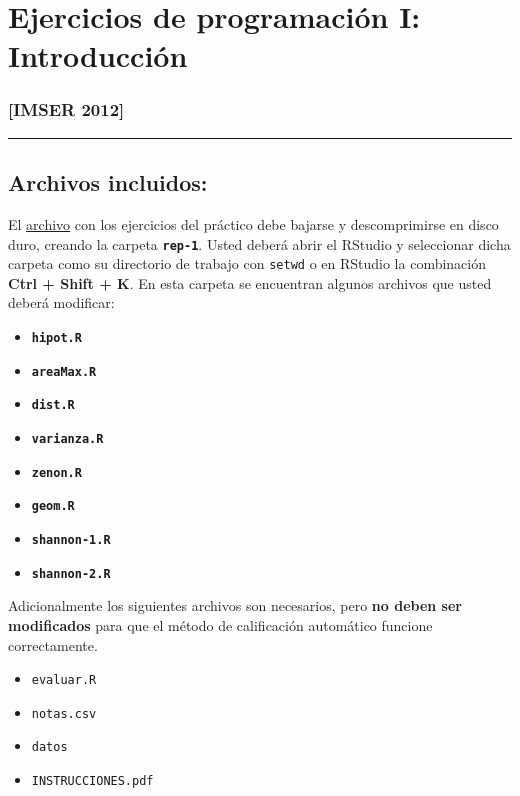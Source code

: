 \documentclass[]{article}
\begin{document}
\section{Ejercicios de programación I: Introducción}

\subsubsection{{[}IMSER 2012{]}}

\begin{center}\rule{3in}{0.4pt}\end{center}

\subsection{Archivos incluidos:}

El
\href{http://eva.universidad.edu.uy/file.php/1454/ejercicios\_de\_programacion/rep-1.zip}{archivo}
con los ejercicios del práctico debe bajarse y descomprimirse en disco
duro, creando la carpeta \textbf{\texttt{rep-1}}. Usted deberá abrir el
RStudio y seleccionar dicha carpeta como su directorio de trabajo con
\texttt{setwd} o en RStudio la combinación \textbf{Ctrl + Shift + K}. En
esta carpeta se encuentran algunos archivos que usted deberá modificar:

\begin{itemize}
\item
  \textbf{\texttt{hipot.R}}
\item
  \textbf{\texttt{areaMax.R}}
\item
  \textbf{\texttt{dist.R}}
\item
  \textbf{\texttt{varianza.R}}
\item
  \textbf{\texttt{zenon.R}}
\item
  \textbf{\texttt{geom.R}}
\item
  \textbf{\texttt{shannon-1.R}}
\item
  \textbf{\texttt{shannon-2.R}}
\end{itemize}
Adicionalmente los siguientes archivos son necesarios, pero \textbf{no
deben ser modificados} para que el método de calificación automático
funcione correctamente.

\begin{itemize}
\item
  \texttt{evaluar.R}
\item
  \texttt{notas.csv}
\item
  \texttt{datos}
\item
  \texttt{INSTRUCCIONES.pdf}
\end{itemize}
\end{document}
